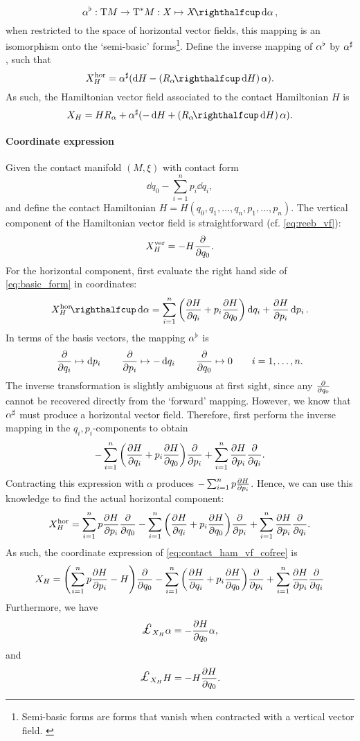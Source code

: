 $$ \toDual{\alpha}: \tbundle{M} \to \ctbundle{M}: X \mapsto  \intpr{X}{\dd{\alpha}},$$
when restricted to the space of horizontal vector fields, this mapping is an isomorphism onto the `semi-basic' forms\footnote{Semi-basic forms are forms that vanish when contracted with a vertical vector field. \cite{Libermann1987}}. Define the inverse mapping of $\alpha^\flat$ by $\alpha^\sharp$, such that
$$ X_H^\text{hor} = \fromDual{\alpha}\qty(\dd{H} - \qty(\intpr{R_\alpha}{\dd{H}})\,\alpha). $$
As such, the Hamiltonian vector field associated to the contact Hamiltonian $H$ is
\begin{equation}
    X_H = H R_\alpha + \fromDual{\alpha}(-\dd{H} + \qty(\intpr{R_\alpha}{\dd{H}})\,\alpha).
    \label{eq:contact_ham_vf_cofree}
\end{equation}

\paragraph{Coordinate expression} Given the contact manifold $(M, \xi)$ with contact form
$$ \dd{q_0} - \sum_{i = 1}^n p_i\dd{q_i}, $$
and define the contact Hamiltonian $H = H(q_0, q_1, \ldots, q_n, p_1, \ldots, p_n)$. 
The vertical component of the Hamiltonian vector field is straightforward (cf. \cref{eq:reeb_vf}): 
$$ X_H^\text{ver} = -H\pdv{}{q_0}. $$
For the horizontal component, first evaluate the right hand side of \cref{eq:basic_form} in coordinates:
$$ \intpr{X_H^\text{hor}}{\dd{\alpha}} =  \sum_{i = 1}^n \qty(\pdv{H}{q_i} + p_i \pdv{H}{q_0})\dd{q_i} + \pdv{H}{p_i}\dd{p_i}. $$
In terms of the basis vectors, the mapping $\alpha^\flat$ is
$$ \pdv{}{q_i} \mapsto \dd{p_i} \qquad \pdv{}{p_i} \mapsto -\dd{q_i} \qquad \pdv{}{q_0} \mapsto 0 \qquad i = 1, \ldots, n.$$
The inverse transformation is slightly ambiguous at first sight, since any $\pdv{}{q_0}$ cannot be recovered directly from the `forward' mapping. However, we know that $\alpha^\sharp$ must produce a horizontal vector field. Therefore, first perform the inverse mapping in the $q_i, p_i$-components to obtain
$$ - \sum_{i = 1}^n \qty(\pdv{H}{q_i} + p_i \pdv{H}{q_0})\pdv{}{p_i} + \sum_{i=1}^n \pdv{H}{p_i}\pdv{}{q_i}. $$
Contracting this expression with $\alpha$ produces $ - \sum_{i=1}^n p\pdv{H}{p_i} $. Hence, we can use this knowledge to find the actual horizontal component:
$$ X_H^\text{hor} = \sum_{i=1}^n p\pdv{H}{p_i} \pdv{}{q_0}- \sum_{i = 1}^n \qty(\pdv{H}{q_i} + p_i \pdv{H}{q_0})\pdv{}{p_i} + \sum_{i=1}^n \pdv{H}{p_i}\pdv{}{q_i}. $$
As such, the coordinate expression of \cref{eq:contact_ham_vf_cofree} is 
\begin{equation}
    X_H = \qty(\sum_{i=1}^n p\pdv{H}{p_i} - H) \pdv{}{q_0}- \sum_{i = 1}^n \qty(\pdv{H}{q_i} + p_i \pdv{H}{q_0})\pdv{}{p_i} + \sum_{i=1}^n \pdv{H}{p_i}\pdv{}{q_i}
\end{equation}
Furthermore, we have
$$ \lied{X_H} \alpha = - \pdv{H}{q_0} \alpha, $$ 
and 
$$ \lied{X_H} H = - H\pdv{H}{q_0}.  $$ 

